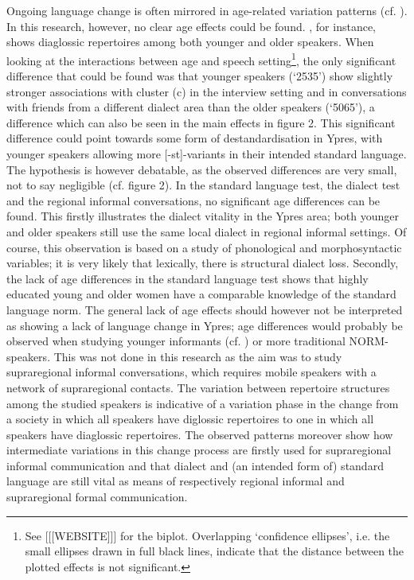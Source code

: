 \documentclass[output=paper]{LSP/langsci}
\begin{document}
Ongoing language change is often mirrored in age-related variation patterns (cf. \citealt{bailey_apparent_1991}). In this research, however, no clear age effects could be found. , for instance, shows diaglossic repertoires among both younger and older speakers. When looking at the interactions between age and speech setting\footnote{See [[[WEBSITE]]] %
for the biplot. Overlapping ‘confidence ellipses’, i.e. the small ellipses drawn in full black lines, indicate that the distance between the plotted effects is not significant.}, the only significant difference that could be found was that younger speakers (‘2535’) show slightly stronger associations with cluster (c) in the interview setting and in conversations with friends from a different dialect area than the older speakers (‘5065’), a difference which can also be seen in the main effects in figure 2. This significant difference could point towards some form of destandardisation in Ypres, with younger speakers allowing more [-st]-variants in their intended standard language. The hypothesis is however debatable, as the observed differences are very small, not to say negligible (cf. figure 2). In the standard language test, the dialect test and the regional informal conversations, no significant age differences can be found. This firstly illustrates the dialect vitality in the Ypres area; both younger and older speakers still use the same local dialect in regional informal settings. Of course, this observation is based on a study of phonological and morphosyntactic variables; it is very likely that lexically, there is structural dialect loss. Secondly, the lack of age differences in the standard language test shows that highly educated young and older women have a comparable knowledge of the standard language norm. The general lack of age effects should however not be interpreted as showing a lack of language change in Ypres; age differences would probably be observed when studying younger informants (cf. \citealt{soete_morfologische_2012}) or more traditional NORM-speakers. This was not done in this research as the aim was to study supraregional informal conversations, which requires mobile speakers with a network of supraregional contacts. The variation between repertoire structures among the studied speakers is indicative of a variation phase in the change from a society in which all speakers have diglossic repertoires to one in which all speakers have diaglossic repertoires. The observed patterns moreover show how intermediate variations in this change process are firstly used for supraregional informal communication and that dialect and (an intended form of) standard language are still vital as means of respectively regional informal and supraregional formal communication. 
\end{document}
